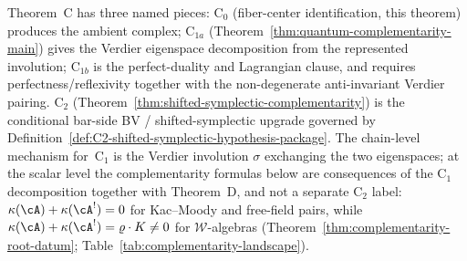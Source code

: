 \begin{remark}\label{rem:theorem-C-decomposition}
Theorem~C has three named pieces: $\mathrm{C}_0$ (fiber-center
identification, this theorem) produces the ambient complex;
$\mathrm{C}_{1a}$ (Theorem~\ref{thm:quantum-complementarity-main})
gives the Verdier eigenspace decomposition from the represented
involution; $\mathrm{C}_{1b}$ is the perfect-duality and Lagrangian
clause, and requires perfectness/reflexivity together with the
non-degenerate anti-invariant Verdier pairing. $\mathrm{C}_2$
(Theorem~\ref{thm:shifted-symplectic-complementarity}) is the
conditional bar-side BV / shifted-symplectic upgrade governed by
Definition~\ref{def:C2-shifted-symplectic-hypothesis-package}.
The chain-level mechanism for~$\mathrm{C}_1$ is the Verdier involution
$\sigma$ exchanging the two eigenspaces; at the scalar level
the complementarity formulas below are consequences of the
$\mathrm{C}_1$ decomposition together with Theorem~D, and not a
separate $\mathrm{C}_2$ label:
$\kappa(\cA)+\kappa(\cA^!)=0$ for Kac--Moody and free-field pairs,
while $\kappa(\cA)+\kappa(\cA^!)=\varrho\cdot K\neq 0$ for
$\mathcal{W}$-algebras (Theorem~\ref{thm:complementarity-root-datum};
Table~\ref{tab:complementarity-landscape}).
\end{remark}

